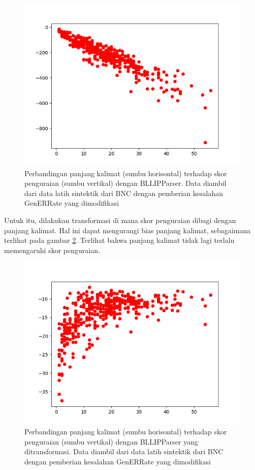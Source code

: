 \documentclass[conference]{IEEEtran}
\begin{document}
\begin{figure}[h]
\centerline{\includegraphics[width=\columnwidth]{figures/figlentoparseprob.png}}
\caption{Perbandingan panjang kalimat (sumbu horisontal) terhadap skor penguraian (sumbu vertikal) dengan BLLIPParser. Data diambil dari data latih sintektik dari BNC dengan pemberian kesalahan GenERRate yang dimodifikasi}
\label{figlentoparseprob}
\end{figure}

Untuk itu, dilakukan transformasi di mana skor penguraian dibagi dengan panjang kalimat. Hal ini dapat mengurangi bias panjang kalimat, sebagaimana terlihat pada gambar \ref{figlentoparseprobtransformed}. Terlihat bahwa panjang kalimat tidak lagi terlalu memengaruhi skor penguraian.

\begin{figure}[h]
\centerline{\includegraphics[width=\columnwidth]{figures/figlentoparseprobtransformed.png}}
\caption{Perbandingan panjang kalimat (sumbu horisontal) terhadap skor penguraian (sumbu vertikal) dengan BLLIPParser yang ditransformasi. Data diambil dari data latih sintektik dari BNC dengan pemberian kesalahan GenERRate yang dimodifikasi}
\label{figlentoparseprobtransformed}
\end{figure}
\end{document}
